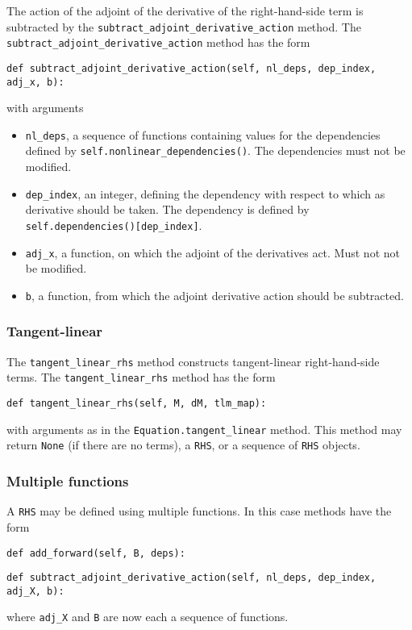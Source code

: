 \documentclass[11pt]{article}
\begin{document}
The action of the adjoint of the derivative of the right-hand-side term is
subtracted by the \texttt{subtract\_adjoint\_derivative\_action} method. The
\texttt{subtract\_adjoint\_derivative\_action} method has the form
\begin{lstlisting}
def subtract_adjoint_derivative_action(self, nl_deps, dep_index, adj_x, b):
\end{lstlisting}
with arguments
\begin{itemize}
  \item \texttt{nl\_deps}, a sequence of functions containing values for the
    dependencies defined by \texttt{self.nonlinear\_dependencies()}. The
    dependencies must not be modified.
  \item \texttt{dep\_index}, an integer, defining the dependency with respect
    to which as derivative should be taken. The dependency is defined by
    \texttt{self.dependencies()[dep\_index]}.
  \item \texttt{adj\_x}, a function, on which the adjoint of the derivatives
    act. Must not not be modified.
  \item \texttt{b}, a function, from which the adjoint derivative action should
    be subtracted.
\end{itemize}

\subsubsection{Tangent-linear}

The \texttt{tangent\_linear\_rhs} method constructs tangent-linear
right-hand-side terms. The \texttt{tangent\_linear\_rhs} method has the form
\begin{lstlisting}
def tangent_linear_rhs(self, M, dM, tlm_map):
\end{lstlisting}
with arguments as in the \texttt{Equation.tangent\_linear} method. This method
may return \texttt{None} (if there are no terms), a \texttt{RHS}, or a sequence
of \texttt{RHS} objects.

\subsubsection{Multiple functions}

A \texttt{RHS} may be defined using multiple functions. In this case methods
have the form
\begin{lstlisting}
def add_forward(self, B, deps):
\end{lstlisting}
\begin{lstlisting}
def subtract_adjoint_derivative_action(self, nl_deps, dep_index, adj_X, b):
\end{lstlisting}
where \texttt{adj\_X} and \texttt{B} are now each a sequence of functions. 
\end{document}
